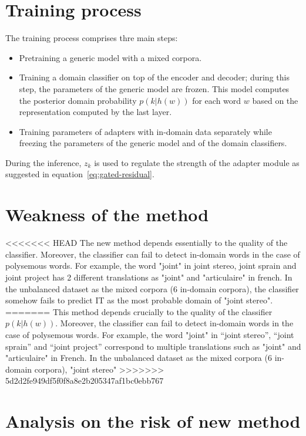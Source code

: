 \documentclass[12pt,a4paper,twoside]{report}
\theoremstyle{definition}
\newcommand{\fyTodo}[1]{\Todo[FY:]{\textcolor{orange}{#1}}}
\begin{document}
\section*{Training process}
The training process comprises thre main steps:
\begin{itemize}
\item Pretraining a generic model with a mixed corpora.
\item Training a domain classifier on top of the encoder and decoder; during this step, the parameters of the generic model are frozen. This model computes the posterior domain probability $p(k|h(w))$ for each word $w$ based on the representation computed by the last layer. \fyTodo{Which layer, which classifier ?}
\item Training parameters of adapters with in-domain data separately while freezing the parameters of the generic model and of the domain classifiers.
\end{itemize}
During the inference, $z_k$ is used to regulate the strength of the adapter module as suggested in equation~\ref{eq:gated-residual}.

\section*{Weakness of the method}
<<<<<<< HEAD
The new method depends essentially to the quality of the classifier. Moreover, the classifier can fail to detect in-domain words in the case of polysemous words. For example, the word "joint" in joint stereo, joint sprain and joint project has 2 different translations as "joint" and "articulaire" in french. In the unbalanced dataset as the mixed corpora (6 in-domain corpora), the classifier somehow fails to predict IT as the most probable domain of "joint stereo".
=======
This method depends crucially to the quality of the classifier $p(k|h(w))$. Moreover, the classifier can fail to detect in-domain words in the case of polysemous words. For example, the word "joint" in ``joint stereo'', ``joint sprain'' and ``joint project'' correspond to multiple translations such as "joint" and "articulaire" in French. In the unbalanced dataset as the mixed corpora (6 in-domain corpora),  "joint stereo" \fyTodo{unfinished sentence}
>>>>>>> 5d2d2fe949df5f0f8a8e2b205347af1bc0ebb767

\section*{Analysis on the risk of new method}
\end{document}
